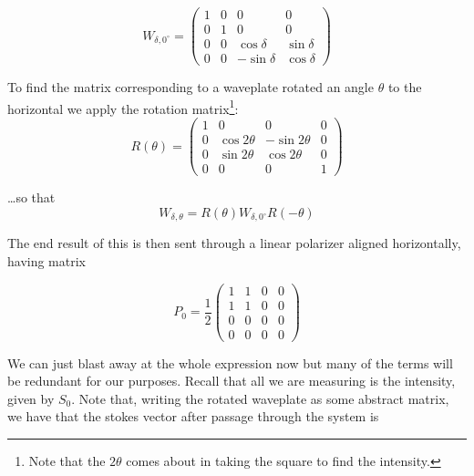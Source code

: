 \documentclass{article}
\begin{document}
\begin{equation}
    \label{eq:mueller_WPH}
    W_{\delta,0^\circ} = \begin{pmatrix}
        1 & 0 & 0 & 0 \\
        0 & 1 & 0 & 0 \\
        0 & 0 & \cos\delta & \sin\delta \\
        0 & 0 & -\sin\delta & \cos\delta 
    \end{pmatrix}
\end{equation}


To find the matrix corresponding to a waveplate rotated an angle $\theta$ to the horizontal we apply the rotation matrix\footnote{Note that the $2\theta$ comes about in taking the square to find the intensity.}:
\begin{equation}
    \label{eq:mueller_rot}
    R(\theta) = \begin{pmatrix}
        1 & 0 & 0 & 0 \\
        0 & \cos2\theta & -\sin2\theta & 0 \\
        0 &  \sin2\theta & \cos2\theta & 0 \\
        0 & 0 & 0 & 1
    \end{pmatrix}
\end{equation}

\noindent\ldots so that 
\begin{equation}
    \label{eq:mueller_rot_symb}
    W_{\delta,\theta} = R(\theta)W_{\delta,0^\circ}R(-\theta)
\end{equation}


The end result of this is then sent through a linear polarizer aligned horizontally, having matrix 

\begin{equation}
    \label{eq:mueller_pol0}
    P_0 = \frac{1}{2}\begin{pmatrix}
        1 & 1 & 0 & 0 \\
        1 & 1 & 0 & 0 \\
        0 & 0 & 0 & 0 \\
        0 & 0 & 0 & 0 
    \end{pmatrix}
\end{equation}

We can just blast away at the whole expression now but many of the terms will be redundant for our purposes. Recall that all we are measuring is the intensity, given by $S_0$. Note that, writing the rotated waveplate as some abstract matrix, we have that the stokes vector after passage through the system is
\end{document}
